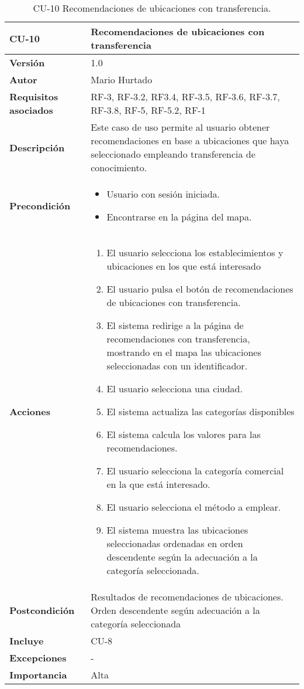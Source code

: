 \begin{table}[p]
	\centering
	\begin{tabularx}{\linewidth}{ p{} p{} }
		\toprule
		\textbf{CU-10}    & \textbf{Recomendaciones de ubicaciones con transferencia}\\
		\toprule
		\textbf{Versión}              & 1.0    \\
		\textbf{Autor}                & Mario Hurtado \\
		\textbf{Requisitos asociados} & RF-3, RF-3.2, RF3.4, RF-3.5, RF-3.6, RF-3.7, RF-3.8, RF-5, RF-5.2, RF-1  \\
		\textbf{Descripción}          & Este caso de uso permite al usuario obtener recomendaciones en base a ubicaciones que haya seleccionado empleando transferencia de conocimiento.\\
		\textbf{Precondición}         & \begin{itemize}
						\tightlist
			\item Usuario con sesión iniciada.
			\item Encontrarse en la página del mapa.
		\end{itemize}\\
		\textbf{Acciones}             &
		\begin{enumerate}
			\def\labelenumi{\arabic{enumi}.}
			\tightlist
			\item El usuario selecciona los establecimientos y ubicaciones en los que está interesado
			\item El usuario pulsa el botón de recomendaciones de ubicaciones con transferencia.
			\item El sistema redirige a la página de recomendaciones con transferencia, mostrando en el mapa las ubicaciones seleccionadas con un identificador.
			\item El usuario selecciona una ciudad.
			\item El sistema actualiza las categorías disponibles
			\item El sistema calcula los valores para las recomendaciones.
			\item El usuario selecciona la categoría comercial en la que está interesado.
			\item El usuario selecciona el método a emplear.
			\item El sistema muestra las ubicaciones seleccionadas ordenadas en orden descendente según la adecuación a la categoría seleccionada.
		\end{enumerate}\\
		\textbf{Postcondición}        & Resultados de recomendaciones de ubicaciones. Orden descendente según adecuación a la categoría seleccionada\\
		\textbf{Incluye}   & CU-8\\
		\textbf{Excepciones}          & - \\
		\textbf{Importancia}          & Alta  \\
		\bottomrule
	\end{tabularx}
	\caption{CU-10 Recomendaciones de ubicaciones con transferencia.}
\end{table}

